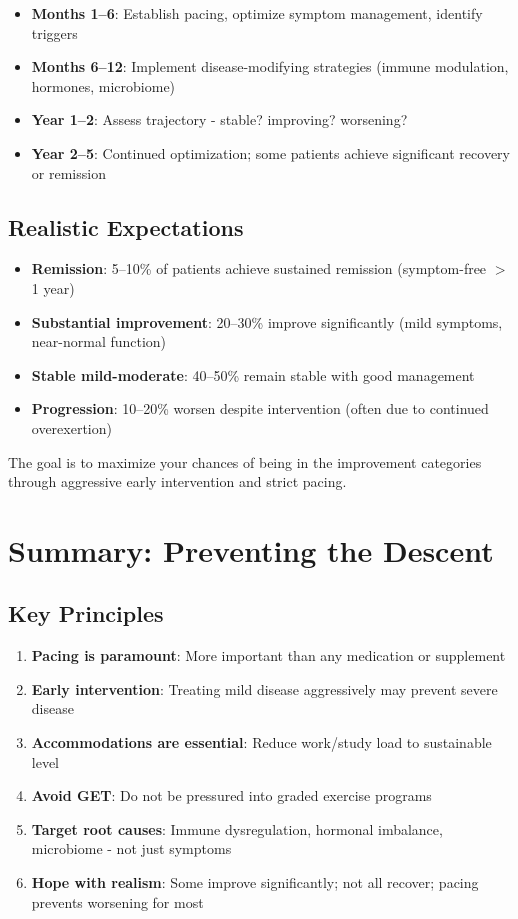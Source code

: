 \begin{itemize}
    \item \textbf{Months 1--6}: Establish pacing, optimize symptom management, identify triggers
    \item \textbf{Months 6--12}: Implement disease-modifying strategies (immune modulation, hormones, microbiome)
    \item \textbf{Year 1--2}: Assess trajectory - stable? improving? worsening?
    \item \textbf{Year 2--5}: Continued optimization; some patients achieve significant recovery or remission
\end{itemize}

\subsection{Realistic Expectations}

\begin{itemize}
    \item \textbf{Remission}: 5--10\% of patients achieve sustained remission (symptom-free $>$1 year)
    \item \textbf{Substantial improvement}: 20--30\% improve significantly (mild symptoms, near-normal function)
    \item \textbf{Stable mild-moderate}: 40--50\% remain stable with good management
    \item \textbf{Progression}: 10--20\% worsen despite intervention (often due to continued overexertion)
\end{itemize}

The goal is to maximize your chances of being in the improvement categories through aggressive early intervention and strict pacing.

\section{Summary: Preventing the Descent}
\label{sec:summary-mild-moderate}

\subsection{Key Principles}

\begin{enumerate}
    \item \textbf{Pacing is paramount}: More important than any medication or supplement
    \item \textbf{Early intervention}: Treating mild disease aggressively may prevent severe disease
    \item \textbf{Accommodations are essential}: Reduce work/study load to sustainable level
    \item \textbf{Avoid GET}: Do not be pressured into graded exercise programs
    \item \textbf{Target root causes}: Immune dysregulation, hormonal imbalance, microbiome - not just symptoms
    \item \textbf{Hope with realism}: Some improve significantly; not all recover; pacing prevents worsening for most
\end{enumerate}

